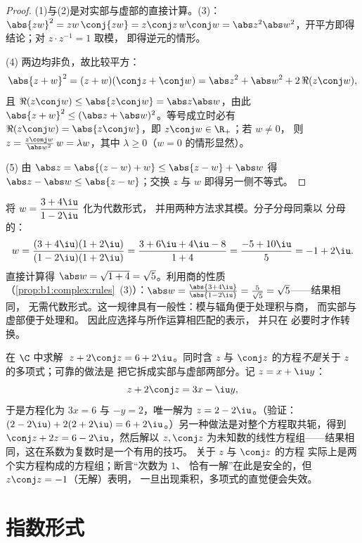 \begin{proof}
(1)与(2)是对实部与虚部的直接计算。(3)：
$\abs{zw}^2 = zw\,\conj{zw} = z\conj z\, w \conj w = \abs z^2 \abs
w^2$，开平方即得结论；对 $z \cdot z^{-1} = 1$ 取模，
即得逆元的情形。

(4) 两边均非负，故比较平方：
\[
\abs{z+w}^2 = (z+w)(\conj z + \conj w)
= \abs z^2 + \abs w^2 + 2\,\Re(z \conj w),
\]
且 $\Re(z\conj w) \leq \abs{z \conj w} = \abs z \abs w$，由此
$\abs{z+w}^2 \leq (\abs z + \abs w)^2$。等号成立时必有 $\Re(z \conj
w) = \abs{z \conj w}$，即 $z \conj w \in \R_+$；若 $w \neq 0$，
则 $z = \frac{z\conj w}{\abs w^2}\, w = \lambda w$，其中 $\lambda
\geq 0$（$w = 0$ 的情形显然）。

(5) 由 $\abs z = \abs{(z - w) + w} \leq \abs{z-w} + \abs w$ 得 $\abs z
- \abs w \leq \abs{z - w}$；交换 $z$ 与 $w$ 即得另一侧不等式。
\end{proof}

\begin{example}[模与辐角的完整演算]\label{ex:b1:complex:workout}
将 $w = \dfrac{3 + 4\iu}{1 - 2\iu}$ 化为代数形式，
并用两种方法求其模。分子分母同乘以
分母的：
\[
w = \frac{(3 + 4\iu)(1 + 2\iu)}{(1 - 2\iu)(1 + 2\iu)}
= \frac{3 + 6\iu + 4\iu - 8}{1 + 4}
= \frac{-5 + 10\iu}{5} = -1 + 2\iu .
\]
直接计算得 $\abs w = \sqrt{1 + 4} = \sqrt5$。利用商的性质
（\cref{prop:b1:complex:rules}~(3)）：$\abs w = \frac{\abs{3 +
4\iu}}{\abs{1 - 2\iu}} = \frac5{\sqrt5} = \sqrt5$——结果相同，
无需代数形式。这一规律具有一般性：模与辐角便于处理积与商，
而实部与虚部便于处理和。
因此应选择与所作运算相匹配的表示，
并只在
必要时才作转换。
\end{example}

\begin{example}[涉及共轭复数的方程]\label{ex:b1:complex:conjeq}
在 $\C$ 中求解 $\;z + 2\conj z = 6 + 2\iu$。同时含 $z$ 与
$\conj z$ 的方程\emph{不是}关于 $z$ 的多项式；可靠的做法是
把它拆成实部与虚部两部分。记 $z = x + \iu y$：
\[
z + 2\conj z = 3x - \iu y ,
\]
于是方程化为 $3x = 6$ 与 $-y = 2$，唯一解为
$z = 2 - 2\iu$。（验证：$(2 - 2\iu) + 2(2 + 2\iu) = 6 +
2\iu$。）另一种做法是对整个方程取共轭，得到
$\conj z + 2z = 6 - 2\iu$，然后解以
$z, \conj z$ 为未知数的线性方程组——结果相同，这在系数为复数时是一个有用的技巧。
关于 $z$ 与 $\conj z$ 的方程
实际上是两个实方程构成的方程组；断言“次数为 $1$、
恰有一解”在此是安全的，但 $z\conj z = -1$（无解）表明，
一旦出现乘积，多项式的直觉便会失效。
\end{example}

\section{指数形式}

